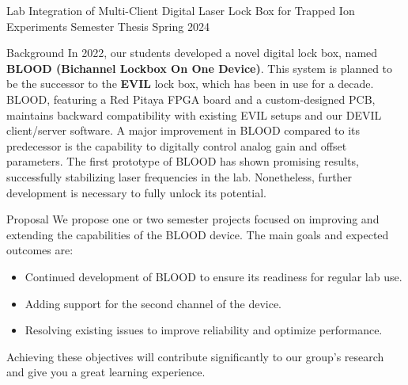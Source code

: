 \documentclass{project-proposal}
\begin{document}
\setmaintextfont
\makepage

\makeheader
{Lab Integration of Multi-​Client Digital Laser Lock Box for Trapped Ion Experiments} %
{Semester Thesis} %
{Spring 2024} %

\begin{section}{Background}
 In 2022, our students developed a novel digital lock box, named
 \textbf{BLOOD (Bichannel Lockbox On One Device)}. This system is planned to be the
 successor to the \textbf{EVIL} lock box, which has been in use for a
 decade. BLOOD, featuring a Red Pitaya FPGA board and a custom-designed PCB,
 maintains backward compatibility with existing EVIL setups and our DEVIL client/server
 software. A major improvement in BLOOD compared to its predecessor is the
 capability to digitally control analog gain and offset parameters. The first prototype
 of BLOOD has shown promising results, successfully stabilizing laser frequencies in
 the lab. Nonetheless, further development is necessary to fully unlock its potential.
\end{section}

\begin{section}{Proposal}
 We propose one or two semester projects focused on improving and extending the
 capabilities of the BLOOD device. The main goals and expected outcomes are:

 \begin{itemize}
     \item {Continued development of BLOOD to ensure its readiness for regular lab use.}
     \item {Adding support for the second channel of the device.}
     \item {Resolving existing issues to improve reliability and optimize performance.}
 \end{itemize}

 Achieving these objectives will contribute significantly to our group's research and
 give you a great learning experience.
\end{section}
\end{document}
